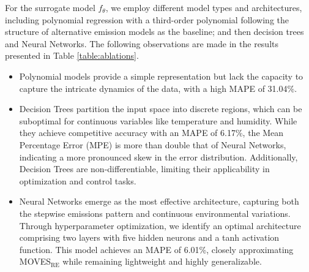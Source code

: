 \documentclass[12pt,english]{article}
\begin{document}
For the surrogate model \( f_\theta \), we employ different model types and architectures, including polynomial regression with a third-order polynomial following the structure of alternative emission models \citep{hbefa, HBEFA_Software} as the baseline; and then decision trees and Neural Networks.
The following observations are made in the results presented in Table \ref{table:ablations}.
\begin{itemize}
    \item {Polynomial models} provide a simple representation but lack the capacity to capture the intricate dynamics of the data, with a high MAPE of 31.04\%.

    \item Decision Trees partition the input space into discrete regions, which can be suboptimal for continuous variables like temperature and humidity. While they achieve competitive accuracy with an MAPE of 6.17\%, the Mean Percentage Error (MPE) is more than double that of Neural Networks, indicating a more pronounced skew in the error distribution. Additionally, Decision Trees are non-differentiable, limiting their applicability in optimization and control tasks.

    \item {Neural Networks} emerge as the most effective architecture, capturing both the stepwise emissions pattern and continuous environmental variations. Through hyperparameter optimization, we identify an optimal architecture comprising two layers with five hidden neurons and a tanh activation function. This model achieves an MAPE of 6.01\%, closely approximating {MOVES}$_\text{RE}$ while remaining lightweight and highly generalizable.
    
\end{itemize}
\end{document}
